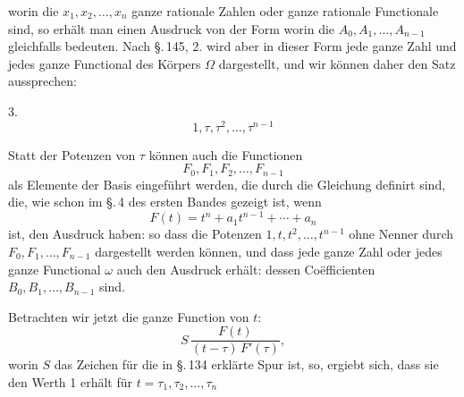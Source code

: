 
worin die $x_1, x_2, \ldots, x_n$ ganze rationale Zahlen oder ganze rationale Functionale sind, so erhält man einen Ausdruck von der Form
worin die $A_0, A_1, \ldots, A_{n-1}$ gleichfalls  bedeuten. Nach \S.\,145, 2. wird aber in dieser Form jede ganze Zahl und jedes ganze Functional des Körpers $\Omega$ dargestellt, und wir können daher den Satz aussprechen:

3. 
\[
1, \tau, \tau^2, \ldots, \tau^{n-1}
\]

Statt der Potenzen von $\tau$ können auch die Functionen
\[
F_0, F_1, F_2, \ldots, F_{n-1}
\]
als Elemente der Basis eingeführt werden, die durch die Gleichung
definirt sind, die, wie schon im \S.\,4 des ersten Bandes gezeigt ist, wenn
\[
F(t) = t^n + a_1t^{n-1} + \cdots + a_n
\]
ist, den Ausdruck haben:
so dass die Potenzen $1, t, t^2, \ldots, t^{n-1}$ ohne Nenner durch $F_0, F_1, \ldots, F_{n-1}$ dargestellt werden können, und dass jede ganze Zahl oder jedes ganze Functional $\omega$ auch den Ausdruck erhält:
dessen Coëfficienten $B_0, B_1, \ldots, B_{n-1}$  sind.

Betrachten wir jetzt die ganze Function von $t$:
\[
S\,\frac{F(t)}{(t-\tau)\,F'(\tau)},
\]
worin $S$ das Zeichen für die in \S.\,134 erklärte Spur ist, so, ergiebt sich, dass sie den Werth 1 erhält für $t=\tau_1,\tau_2,\ldots,\tau_n$
